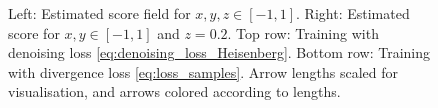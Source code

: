 \documentclass[10pt]{amsart}
\theoremstyle{remark}
\numberwithin{equation}{section}
\begin{document}
\begin{figure}[ht]
\caption{Left: Estimated score field for $x,y,z\in[-1,1]$. Right: Estimated score for $x,y\in[-1,1]$ and $z=0.2$. Top row: Training with denoising loss \eqref{eq:denoising_loss_Heisenberg}. Bottom row: Training with divergence loss \eqref{eq:loss_samples}.
Arrow lengths scaled for visualisation, and arrows colored according to lengths.}
\label{fig:s1}
\end{figure}




\end{document}
